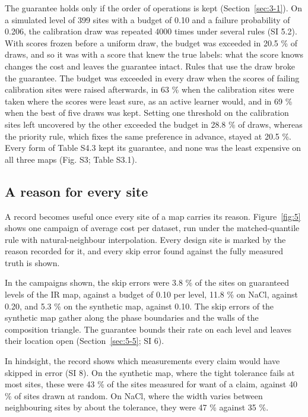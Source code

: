 \documentclass{iopjournal}
\begin{document}
The guarantee holds only if the order of operations is kept (Section~\ref{sec:3-1}). On a simulated level of 399 sites with a budget of 0.10 and a failure probability of 0.206, the calibration draw was repeated 4000 times under several rules (SI 5.2). With scores frozen before a uniform draw, the budget was exceeded in 20.5 \% of draws, and so it was with a score that knew the true labels: what the score knows changes the cost and leaves the guarantee intact. Rules that use the draw broke the guarantee. The budget was exceeded in every draw when the scores of failing calibration sites were raised afterwards, in 63 \% when the calibration sites were taken where the scores were least sure, as an active learner would, and in 69 \% when the best of five draws was kept. Setting one threshold on the calibration sites left uncovered by the other exceeded the budget in 28.8 \% of draws, whereas the priority rule, which fixes the same preference in advance, stayed at 20.5 \%. Every form of Table S4.3 kept its guarantee, and none was the least expensive on all three maps (Fig. S3; Table S3.1).

\hypertarget{sec:5-3}{%
\subsection{A reason for every site}\label{sec:5-3}}

A record becomes useful once every site of a map carries its reason. Figure~\ref{fig:5} shows one campaign of average cost per dataset, run under the matched-quantile rule with natural-neighbour interpolation. Every design site is marked by the reason recorded for it, and every skip error found against the fully measured truth is shown.

In the campaigns shown, the skip errors were 3.8 \% of the sites on guaranteed levels of the IR map, against a budget of 0.10 per level, 11.8 \% on NaCl, against 0.20, and 5.3 \% on the synthetic map, against 0.10. The skip errors of the synthetic map gather along the phase boundaries and the walls of the composition triangle. The guarantee bounds their rate on each level and leaves their location open (Section~\ref{sec:5-5}; SI 6).

In hindsight, the record shows which measurements every claim would have skipped in error (SI 8). On the synthetic map, where the tight tolerance fails at most sites, these were 43 \% of the sites measured for want of a claim, against 40 \% of sites drawn at random. On NaCl, where the width varies between neighbouring sites by about the tolerance, they were 47 \% against 35 \%.
\end{document}
